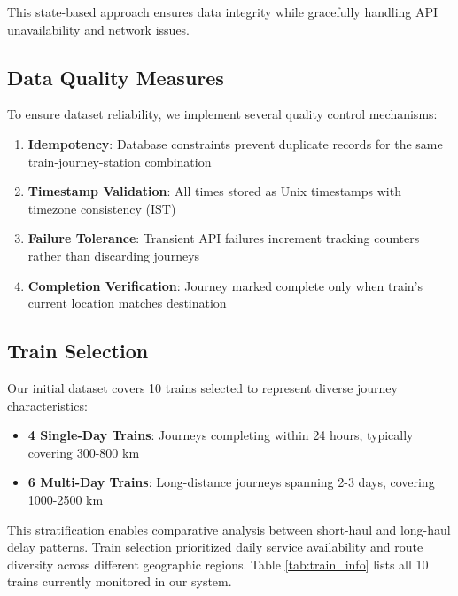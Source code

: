 \documentclass[conference]{IEEEtran}
\begin{document}
This state-based approach ensures data integrity while gracefully handling API unavailability and network issues.

\subsection{Data Quality Measures}

To ensure dataset reliability, we implement several quality control mechanisms:

\begin{enumerate}
    \item \textbf{Idempotency}: Database constraints prevent duplicate records for the same train-journey-station combination
    \item \textbf{Timestamp Validation}: All times stored as Unix timestamps with timezone consistency (IST)
    \item \textbf{Failure Tolerance}: Transient API failures increment tracking counters rather than discarding journeys
    \item \textbf{Completion Verification}: Journey marked complete only when train's current location matches destination
\end{enumerate}

\subsection{Train Selection}

Our initial dataset covers 10 trains selected to represent diverse journey characteristics:

\begin{itemize}
    \item \textbf{4 Single-Day Trains}: Journeys completing within 24 hours, typically covering 300-800 km
    \item \textbf{6 Multi-Day Trains}: Long-distance journeys spanning 2-3 days, covering 1000-2500 km
\end{itemize}

This stratification enables comparative analysis between short-haul and long-haul delay patterns. Train selection prioritized daily service availability and route diversity across different geographic regions. Table \ref{tab:train_info} lists all 10 trains currently monitored in our system.
\end{document}
